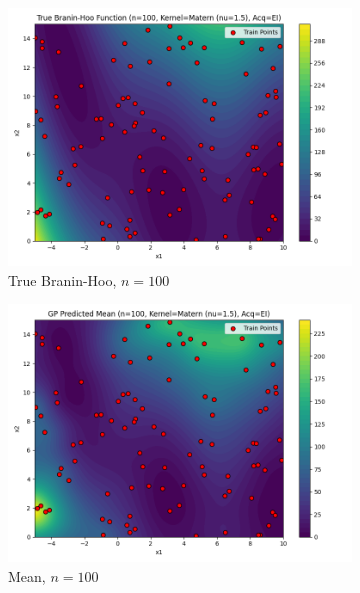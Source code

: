 \documentclass[a4paper,12pt]{article}
\begin{document}
\begin{figure}[H]
\begin{subfigure}{0.3\textwidth}
  \includegraphics[width=\linewidth]{Task-02/images/true_function_matern_n100_EI.png}
  \caption{True Branin-Hoo, $n=100$}
\end{subfigure}
\begin{subfigure}{0.3\textwidth}
    \includegraphics[width=\linewidth]{Task-02/images/gp_mean_matern_n100_EI.png}
    \caption{Mean, $n=100$}
\end{subfigure}
\begin{subfigure}{0.3\textwidth}

\end{subfigure}
\end{figure}
\end{document}
